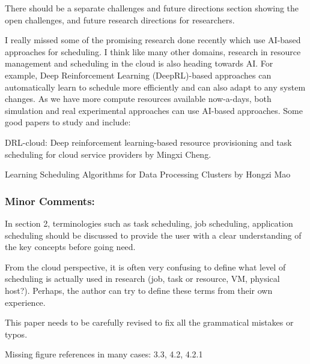
There should be a separate challenges and future directions section showing the open challenges, and future research directions for researchers.


I really missed some of the promising research done recently which use AI-based approaches for scheduling. I think like many other domains, research in resource management and scheduling in the cloud is also heading towards AI. For example, Deep Reinforcement Learning (DeepRL)-based approaches can automatically learn to schedule more efficiently and can also adapt to any system changes. As we have more compute resources available now-a-days, both simulation and real experimental approaches can use AI-based approaches. Some good papers to study and include:



DRL-cloud: Deep reinforcement learning-based resource provisioning and task scheduling for cloud service providers by Mingxi Cheng.


Learning Scheduling Algorithms for Data Processing Clusters by Hongzi Mao



\subsubsection{Minor Comments:}

In section 2, terminologies such as task scheduling, job scheduling, application scheduling should be discussed to provide the user with a clear understanding of the key concepts before going need.


From the cloud perspective, it is often very confusing to define what level of scheduling is actually used in research (job, task or resource, VM, physical host?). Perhaps, the author can try to define these terms from their own experience.


This paper needs to be carefully revised to fix all the grammatical mistakes or typos.


Missing figure references in many cases: 3.3, 4.2, 4.2.1




